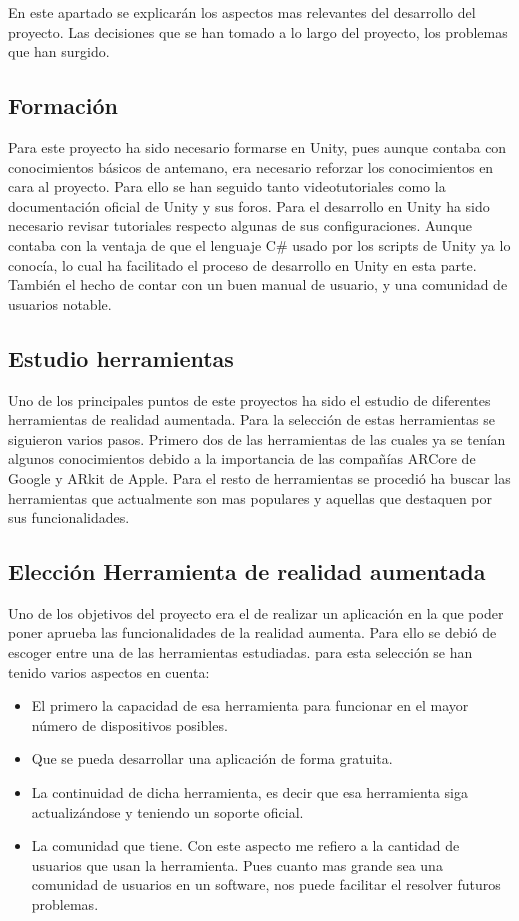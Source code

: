 En este apartado se explicarán los aspectos mas relevantes del desarrollo del proyecto. Las decisiones que se han tomado a lo largo del proyecto, los problemas que han surgido.

\subsection{Formación}
Para este proyecto ha sido necesario formarse en Unity, pues aunque contaba con conocimientos básicos de antemano, era necesario reforzar los conocimientos en cara al proyecto. Para ello se han seguido tanto videotutoriales como la documentación oficial de Unity y sus foros.
Para el desarrollo en Unity ha sido necesario revisar tutoriales respecto algunas de sus configuraciones.
Aunque contaba con la ventaja de que el lenguaje C\# usado por los scripts de Unity ya lo conocía, lo cual ha facilitado el proceso de desarrollo en Unity en esta parte. También el hecho de contar con un buen manual de usuario, y una comunidad de usuarios notable.

\subsection{Estudio herramientas}
Uno de los principales puntos de este proyectos ha sido el estudio de diferentes herramientas de realidad aumentada. Para la selección de estas herramientas se siguieron varios pasos. Primero dos de las herramientas de las cuales ya se tenían algunos conocimientos debido a la importancia de las compañías ARCore de Google y ARkit de Apple. Para el resto de herramientas se procedió ha buscar las herramientas que actualmente son mas populares y aquellas que destaquen por sus funcionalidades.

\subsection{Elección Herramienta de realidad aumentada}

Uno de los objetivos del proyecto era el de realizar un aplicación en la que poder poner aprueba las funcionalidades de la realidad aumenta. Para ello se debió de escoger entre una de las herramientas estudiadas. para esta selección se han tenido varios aspectos en cuenta: 
\begin{itemize}
	\item El primero la capacidad de esa herramienta para funcionar en el mayor número de dispositivos posibles.
	\item Que se pueda desarrollar una aplicación de forma gratuita.
	\item La continuidad de dicha herramienta, es decir que esa herramienta siga actualizándose y teniendo un soporte oficial.
	\item La comunidad que tiene. Con este aspecto me refiero a la cantidad de usuarios que usan la herramienta. Pues cuanto mas grande sea una comunidad de usuarios en un software, nos puede facilitar el resolver futuros problemas.
	
\end{itemize}

